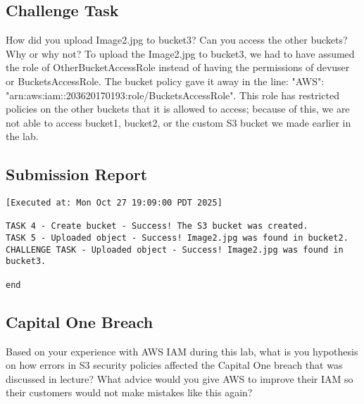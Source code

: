 \documentclass[11pt]{article}
\begin{document}
\subsection*{Challenge Task}
How did you upload Image2.jpg to bucket3? Can you access the other buckets? Why or why not?
To upload the Image2.jpg to bucket3, we had to have assumed the role of OtherBucketAccessRole instead of having the permissions of devuser or BucketsAccessRole. The bucket policy gave it away in the line: "AWS": "arn:aws:iam::203620170193:role/BucketsAccessRole". This role has restricted policies on the other buckets that it is allowed to access; because of this, we are not able to access bucket1, bucket2, or the custom S3 bucket we made earlier in the lab.

\subsection*{Submission Report}

\begin{verbatim}
[Executed at: Mon Oct 27 19:09:00 PDT 2025]

TASK 4 - Create bucket - Success! The S3 bucket was created.
TASK 5 - Uploaded object - Success! Image2.jpg was found in bucket2.
CHALLENGE TASK - Uploaded object - Success! Image2.jpg was found in bucket3.

end
\end{verbatim}

\subsection*{Capital One Breach}
Based on your experience with AWS IAM during this lab, what is you hypothesis on how errors in S3 security policies affected the Capital One breach that was discussed in lecture? What advice would you give AWS to improve their IAM so their customers would not make mistakes like this again?
\end{document}
